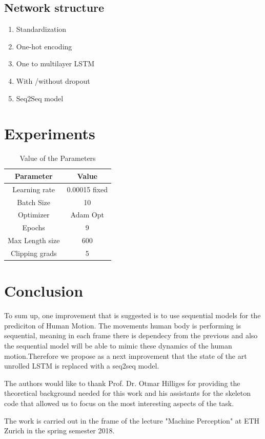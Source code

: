 \subsection{Network structure}
 
 \begin{enumerate}
 	\item Standardization
 	\item One-hot encoding
 	\item One to multilayer LSTM
 	\item With /without dropout
 	\item Seq2Seq model
 \end{enumerate}

\section{Experiments}

\begin{table}[]
	\centering
	\caption{Value of the Parameters }
	\label{my-label}
	\begin{tabular}{cc}
			Parameter& Value \\
		\hline
     	\hline
		Learning rate  &  0.00015 fixed    \\
		Batch Size  & 10 \\
		Optimizer  & Adam Opt  \\
		Epochs  & 9 \\
		Max Length size  &  600 \\
		Clipping grads &  5\\
		\hline
	\end{tabular}
\end{table}

\section{Conclusion}

To sum up, one improvement that is suggested is to use sequential models for the prediciton of Human Motion. The movements human body is performing is sequential, meaning in each frame there is dependecy from the previous and also the sequential model will be able to mimic these dynamics of the human motion.Therefore we propose as a next improvement that the state of the art unrolled LSTM is replaced with a seq2seq model. 
\begin{acks}
	The authors would like to thank Prof. Dr. Otmar Hilliges for providing the theoretical background needed for this work and his assistants for the skeleton code that allowed us to focus on the most interesting aspects of the task.
	
	The work is carried out in the frame of the lecture "Machine Perception" at ETH Zurich in the spring semester 2018.
	
\end{acks}


